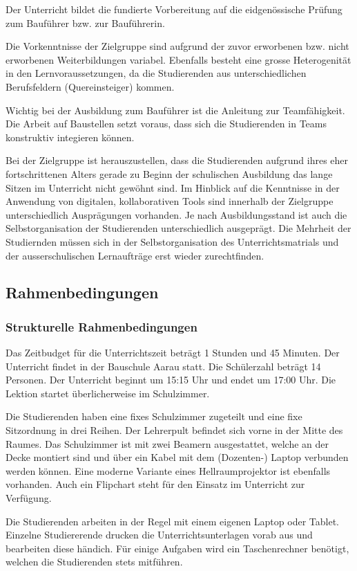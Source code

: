 \documentclass[
11pt,
captions=tableheading,
smallheadings,
headsepline,
footsepline, 
captions=tableheading,
parskip=half-,
]{scrartcl}
\begin{document}
Der Unterricht bildet die fundierte Vorbereitung auf die eidgenössische Prüfung zum Bauführer bzw. zur Bauführerin.


Die Vorkenntnisse der Zielgruppe sind aufgrund der zuvor erworbenen bzw. nicht erworbenen Weiterbildungen variabel.
Ebenfalls besteht eine grosse Heterogenität in den Lernvoraussetzungen, da die Studierenden aus unterschiedlichen Berufsfeldern (Quereinsteiger) kommen.

Wichtig bei der Ausbildung zum Bauführer ist die Anleitung zur Teamfähigkeit. Die Arbeit auf Baustellen setzt voraus, dass sich die Studierenden in Teams konstruktiv integieren können.

Bei der Zielgruppe ist herauszustellen, dass die Studierenden aufgrund ihres eher fortschrittenen Alters gerade zu Beginn der schulischen Ausbildung das lange Sitzen im Unterricht nicht gewöhnt sind.
Im Hinblick auf die Kenntnisse in der Anwendung von digitalen, kollaborativen Tools sind innerhalb der Zielgruppe unterschiedlich Ausprägungen vorhanden.
Je nach Ausbildungsstand ist auch die Selbstorganisation der Studierenden unterschiedlich ausgeprägt.
Die Mehrheit der Studiernden müssen sich in der Selbstorganisation des Unterrichtsmatrials und der ausserschulischen Lernaufträge erst wieder zurechtfinden.

\subsection{Rahmenbedingungen}
\subsubsection{Strukturelle Rahmenbedingungen}
Das Zeitbudget für die Unterrichtszeit beträgt 1 Stunden und 45 Minuten.
Der Unterricht findet in der Bauschule Aarau statt. Die Schülerzahl beträgt 14 Personen.
Der Unterricht beginnt um 15:15 Uhr und endet um 17:00 Uhr.
Die Lektion startet überlicherweise im Schulzimmer.

Die Studierenden haben eine fixes Schulzimmer zugeteilt und eine fixe Sitzordnung in drei Reihen.
Der Lehrerpult befindet sich vorne in der Mitte des Raumes.
Das Schulzimmer ist mit zwei Beamern ausgestattet, welche an der Decke montiert sind und über ein Kabel mit dem (Dozenten-) Laptop verbunden werden können.
Eine moderne Variante eines  Hellraumprojektor ist ebenfalls vorhanden. Auch ein Flipchart steht für den Einsatz im Unterricht zur Verfügung.


Die Studierenden arbeiten in der Regel mit einem eigenen Laptop oder Tablet. Einzelne Studiererende drucken die Unterrichtsunterlagen vorab aus und bearbeiten diese händich.
Für einige Aufgaben wird ein Taschenrechner benötigt, welchen die Studierenden stets mitführen.
\end{document}
